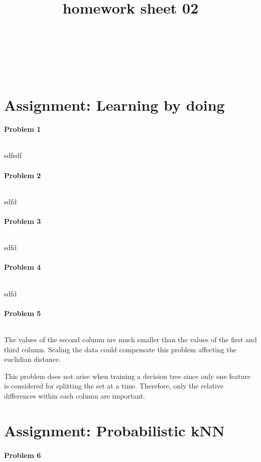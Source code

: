 \documentclass{article}
\title{homework sheet 02}
\author{
\name{Andre Seitz}\\
\imat{03622870}\\
\email{andre.seitz@mytum.de}
\And
\name{Linda Leidig} \\
\imat{03608416}\\
\email{linda.leidig@tum.de}
}
\begin{document}
\maketitle

\section{Assignment: Learning by doing}
\paragraph*{Problem 1}
$\;$ 

sdfsdf


\paragraph*{Problem 2}
$\;$ 

sdfd

\paragraph*{Problem 3}
$\;$ 

sdfd

\paragraph*{Problem 4}
$\;$ 

sdfd

\paragraph*{Problem 5}
$\;$ 

The values of the second column are much smaller than the values of the first and third column. Scaling the data could compensate this problem affecting the euclidian distance.

This problem does not arise when training a decision tree since only one feature is considered for splitting the set at a time. Therefore, only the relative differences within each column are important.

\section{Assignment: Probabilistic kNN}
\paragraph*{Problem 6}
$\;$ 
\end{document}
